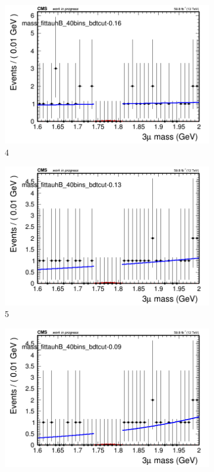 \begin{figure}[h!]
\begin{subfigure}{0.2\textwidth}
        \includegraphics[width=\textwidth]{unfixed_exp/plots/tauhB/massfit_tauhB_40bins_bdtcut-0.16.png}
        \caption{4}
    \end{subfigure}
    \begin{subfigure}{0.2\textwidth}
        \includegraphics[width=\textwidth]{unfixed_exp/plots/tauhB/massfit_tauhB_40bins_bdtcut-0.13.png}
        \caption{5}
    \end{subfigure}
    \begin{subfigure}{0.2\textwidth}
        \includegraphics[width=\textwidth]{unfixed_exp/plots/tauhB/massfit_tauhB_40bins_bdtcut-0.09.png}

\end{subfigure}
\end{figure}
